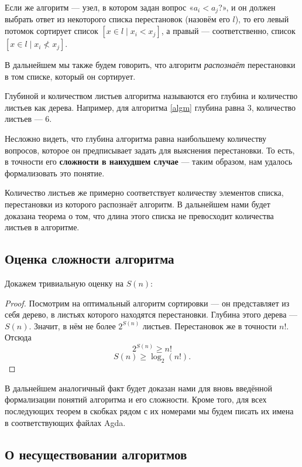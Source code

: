 \abz Если же алгоритм — узел, в котором задан вопрос «$a_i < a_j$?», и он должен выбрать ответ из некоторого списка перестановок (назовём его $l$), то его левый потомок сортирует список $[x \in l \mid x_i < x_j]$, а правый — соответственно, список $[x \in l \mid x_i \not < x_j]$.

\abz В дальнейшем мы также будем говорить, что алгоритм {\it распознаёт} перестановки в том списке, который он сортирует.

\abz Глубиной и количеством листьев алгоритма называются его глубина и количество листьев как дерева. Например, для алгоритма \ref{algm} глубина равна 3, количество листьев — 6.

\abz Несложно видеть, что глубина алгоритма равна наибольшему количеству вопросов, которое он предписывает задать для выяснения перестановки. То есть, в точности его {\bf сложности в наихудшем случае} — таким образом, нам удалось формализовать это понятие.

\abz Количество листьев же примерно соответствует количеству элементов списка, перестановки из которого распознаёт алгоритм. В дальнейшем нами будет доказана теорема о том, что длина этого списка не превосходит количества листьев в алгоритме.

\subsection
[Доказательство оценки сложности алгоритма]
{Оценка сложности алгоритма}

Докажем тривиальную оценку на $S(n)$:


\begin{proof}
Посмотрим на оптимальный алгоритм сортировки — он представляет из себя дерево, в листьях которого находятся перестановки. Глубина этого дерева — $S(n)$. Значит, в нём не более $2^{S(n)}$ листьев. Перестановок же в точности $n!$. Отсюда
$$2^{S(n)} \ge n!$$
\vspace{-0.4cm}
$$S(n) \ge \log_2 (n!).$$
\end{proof}

В дальнейшем аналогичный факт будет доказан нами для вновь введённой формализации понятий алгоритма и его сложности. Кроме того, для всех последующих теорем в скобках рядом с их номерами мы будем писать их имена в соответствующих файлах Agda.

\subsection
[Принципы доказательства несуществования алгоритмов]
{О несуществовании алгоритмов}

